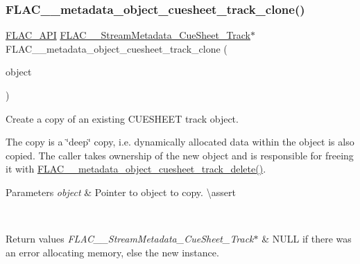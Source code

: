 \subsubsection{\texorpdfstring{FLAC\_\_metadata\_object\_cuesheet\_track\_clone()}{FLAC\_\_metadata\_object\_cuesheet\_track\_clone()}}
{\footnotesize\ttfamily \mbox{\hyperlink{group__flac__export_ga56ca07df8a23310707732b1c0007d6f5}{F\+L\+A\+C\+\_\+\+A\+PI}} \mbox{\hyperlink{struct_f_l_a_c_____stream_metadata___cue_sheet___track}{F\+L\+A\+C\+\_\+\+\_\+\+Stream\+Metadata\+\_\+\+Cue\+Sheet\+\_\+\+Track}}$\ast$ F\+L\+A\+C\+\_\+\+\_\+metadata\+\_\+object\+\_\+cuesheet\+\_\+track\+\_\+clone (\begin{DoxyParamCaption}\item[{const \mbox{\hyperlink{struct_f_l_a_c_____stream_metadata___cue_sheet___track}{F\+L\+A\+C\+\_\+\+\_\+\+Stream\+Metadata\+\_\+\+Cue\+Sheet\+\_\+\+Track}} $\ast$}]{object }\end{DoxyParamCaption})}

Create a copy of an existing C\+U\+E\+S\+H\+E\+ET track object.

The copy is a \char`\"{}deep\char`\"{} copy, i.\+e. dynamically allocated data within the object is also copied. The caller takes ownership of the new object and is responsible for freeing it with \mbox{\hyperlink{group__flac__metadata__object_ga8fbf8912add405a4b1acd510b6e27c89}{F\+L\+A\+C\+\_\+\+\_\+metadata\+\_\+object\+\_\+cuesheet\+\_\+track\+\_\+delete()}}.


\begin{DoxyParams}{Parameters}
{\em object} & Pointer to object to copy. \textbackslash{}assert 
\begin{DoxyCode}{1}
\end{DoxyCode}
 \\
\hline
\end{DoxyParams}

\begin{DoxyRetVals}{Return values}
{\em F\+L\+A\+C\+\_\+\+\_\+\+Stream\+Metadata\+\_\+\+Cue\+Sheet\+\_\+\+Track$\ast$} & {\ttfamily N\+U\+LL} if there was an error allocating memory, else the new instance. \\
\hline
\end{DoxyRetVals}
\mbox{\label{group__flac__metadata__object_ga8fbf8912add405a4b1acd510b6e27c89}} 
